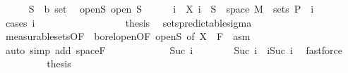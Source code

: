 \begin{isabellebody}
\ \ \ \ \isamarkupfalse%
\ S\ {\isacharcolon}{\kern0pt}{\isacharcolon}{\kern0pt}\ {\isachardoublequoteopen}{\isacharprime}{\kern0pt}b\ set{\isachardoublequoteclose}\ \isamarkupfalse%
\ open{\isacharunderscore}{\kern0pt}S{\isacharcolon}{\kern0pt}\ {\isachardoublequoteopen}open\ S{\isachardoublequoteclose}\isanewline
\ \ \ \ \isamarkupfalse%
\ {\isachardoublequoteopen}{\isacharbraceleft}{\kern0pt}i{\isacharbraceright}{\kern0pt}\ {\isasymtimes}\ {\isacharparenleft}{\kern0pt}X\ i\ {\isacharminus}{\kern0pt}{\isacharbackquote}{\kern0pt}\ S\ {\isasyminter}\ space\ M{\isacharparenright}{\kern0pt}\ {\isasymin}\ sets\ {\isasymSigma}\isactrlsub P{\isachardoublequoteclose}\ \ i\ \isanewline
\ \ \ \ \isamarkupfalse%
\ {\isacharparenleft}{\kern0pt}cases\ i{\isacharparenright}{\kern0pt}\isanewline
\ \ \ \ \ \ \isamarkupfalse%
\ {}\isanewline
\ \ \ \ \ \ \isamarkupfalse%
\ \isamarkupfalse%
\ {\isacharquery}{\kern0pt}thesis\ \isamarkupfalse%
\ sets{\isacharunderscore}{\kern0pt}predictable{\isacharunderscore}{\kern0pt}sigma\ \isanewline
\ \ \ \ \ \ \ \ \isamarkupfalse%
\ measurable{\isacharunderscore}{\kern0pt}sets{\isacharbrackleft}{\kern0pt}OF\ {\isacharunderscore}{\kern0pt}\ borel{\isacharunderscore}{\kern0pt}open{\isacharbrackleft}{\kern0pt}OF\ open{\isacharunderscore}{\kern0pt}S{\isacharbrackright}{\kern0pt}{\isacharcomma}{\kern0pt}\ of\ {\isachardoublequoteopen}X\ {}{\isachardoublequoteclose}\ {\isachardoublequoteopen}F\ {}{\isachardoublequoteclose}{\isacharbrackright}{\kern0pt}\ asm\ \isanewline
\ \ \ \ \ \ \ \ \isamarkupfalse%
\ {\isacharparenleft}{\kern0pt}auto\ simp\ add{\isacharcolon}{\kern0pt}\ space{\isacharunderscore}{\kern0pt}F{\isacharparenright}{\kern0pt}\isanewline
\ \ \ \ \isamarkupfalse%
\isanewline
\ \ \ \ \ \ \isamarkupfalse%
\ {\isacharparenleft}{\kern0pt}Suc\ i{\isacharparenright}{\kern0pt}\isanewline
\ \ \ \ \ \ \isamarkupfalse%
\ {\isachardoublequoteopen}{\isacharbraceleft}{\kern0pt}Suc\ i{\isacharbraceright}{\kern0pt}\ {\isacharequal}{\kern0pt}\ {\isacharbraceleft}{\kern0pt}i{\isacharless}{\kern0pt}{\isachardot}{\kern0pt}{\isachardot}{\kern0pt}Suc\ i{\isacharbraceright}{\kern0pt}{\isachardoublequoteclose}\ \isamarkupfalse%
\ fastforce\isanewline
\ \ \ \ \ \ \isamarkupfalse%
\ \isamarkupfalse%
\ {\isacharquery}{\kern0pt}thesis\ \isamarkupfalse%

\end{isabellebody}
